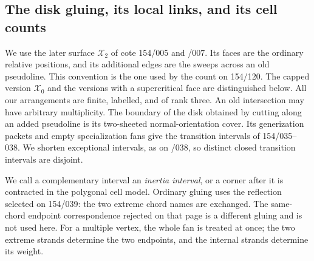 \subsection{The disk gluing, its local links, and its cell counts}

We use the later surface $\mathcal X_2$ of cote 154/005 and /007.
Its faces are the ordinary relative positions, and its additional edges
are the sweeps across an old pseudoline. This convention is the one used
by the count on 154/120. The capped version $\mathcal X_0$ and the versions
with a supercritical face are distinguished below. All our arrangements
are finite, labelled, and of rank three. An old intersection may have
arbitrary multiplicity. The boundary of the disk obtained by cutting
along an added pseudoline is its two-sheeted normal-orientation cover.
Its generization packets and empty specialization fans give the
transition intervals of 154/035--038. We shorten exceptional intervals,
as on /038, so distinct closed transition intervals are disjoint.

We call a complementary interval an \emph{inertia interval}, or a corner
after it is contracted in the polygonal cell model. Ordinary gluing uses
the reflection selected on 154/039: the two extreme chord names are
exchanged. The same-chord endpoint correspondence rejected on that page
is a different gluing and is not used here. For a multiple vertex, the
whole fan is treated at once; the two extreme strands determine the two
endpoints, and the internal strands determine its weight.

